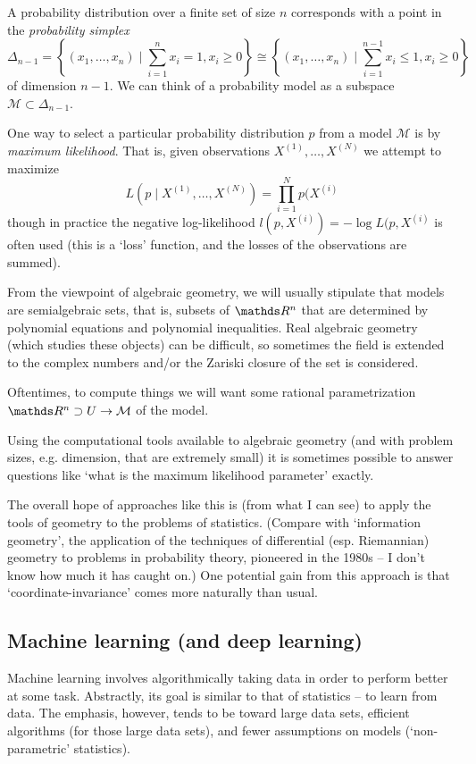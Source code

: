 \documentclass[11pt]{article}
\newcommand*{\Mod}{\mathcal{M}}
\begin{document}
A probability distribution over a finite set of size $n$ corresponds with a
point in the \emph{probability simplex}
\[
    \Delta_{n-1} = 
    \left\{(x_1, \ldots, x_{n}) \mid \sum_{i=1}^n x_i= 1, x_i \ge 0 \right\} 
    \cong 
    \left\{(x_1, \ldots, x_n) \mid \sum_{i=1}^{n-1} x_i \le 1, x_i \ge 0 \right\}
\]
of dimension $n-1$.  We can think of a probability model as a subspace 
$\Mod \subset \Delta_{n-1}$.

One way to select a particular probability distribution $p$ from a model $\Mod$
is by \emph{maximum likelihood}.  That is, given observations $X^{(1)}, \ldots,
X^{(N)}$ we attempt to maximize
\[
    L(p \mid X^{(1)}, \ldots, X^{(N)}) = \prod_{i=1}^N p(X^{(i)}
\]
though in practice the negative log-likelihood $l(p, X^{(i)}) = -\log L(p, X^{(i)}$ is
often used (this is a `loss' function, and the losses of the observations are
summed).

From the viewpoint of algebraic geometry, we will usually stipulate that models
are semialgebraic sets, that is, subsets of $\R^n$ that are determined by
polynomial equations and polynomial inequalities.  Real algebraic geometry
(which studies these objects) can be difficult, so sometimes the field is
extended to the complex numbers and/or the Zariski closure of the set is
considered.

Oftentimes, to compute things we will want some rational parametrization $\R^n
\supset U \to \Mod$ of the model.

Using the computational tools available to algebraic geometry (and with problem
sizes, e.g. dimension, that are extremely small) it is sometimes possible to
answer questions like `what is the maximum likelihood parameter' exactly.

The overall hope of approaches like this is (from what I can see) to apply the
tools of geometry to the problems of statistics.  (Compare with `information
geometry', the application of the techniques of differential (esp. Riemannian)
geometry to problems in probability theory, pioneered in the 1980s -- I don't
know how much it has caught on.)  One potential gain from this approach is that
`coordinate-invariance' comes more naturally than usual.


\subsection{Machine learning (and deep learning)}

Machine learning involves algorithmically taking data in order to perform better
at some task.  Abstractly, its goal is similar to that of statistics -- to learn
from data.  The emphasis, however, tends to be toward large data sets, efficient
algorithms (for those large data sets), and fewer assumptions on models
(`non-parametric' statistics).  
\end{document}
